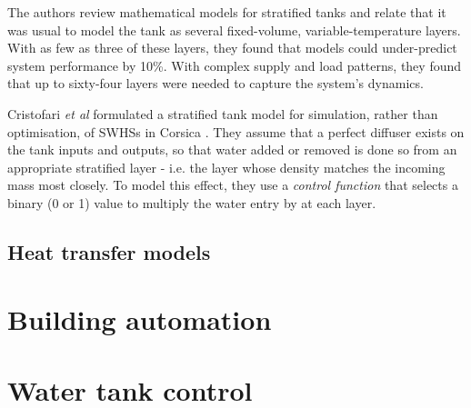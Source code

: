 The authors review mathematical models for stratified tanks and relate that it was usual to model the tank as several fixed-volume, variable-temperature layers.
With as few as three of these layers, they found that models could under-predict system performance by 10\%.
With complex supply and load patterns, they found that up to sixty-four layers were needed to capture the system's dynamics.

Cristofari {\it et al} formulated a stratified tank model for simulation, rather than optimisation, of SWHSs in Corsica \cite{Cristofari02}.
They assume that a perfect diffuser exists on the tank inputs and outputs, so that water added or removed is done so from an appropriate stratified layer - i.e. the layer whose density matches the incoming mass most closely.
To model this effect, they use a {\it control function} that selects a binary (0 or 1) value to multiply the water entry by at each layer.

\subsection{Heat transfer models}


\section{Building automation}


\section{Water tank control}

